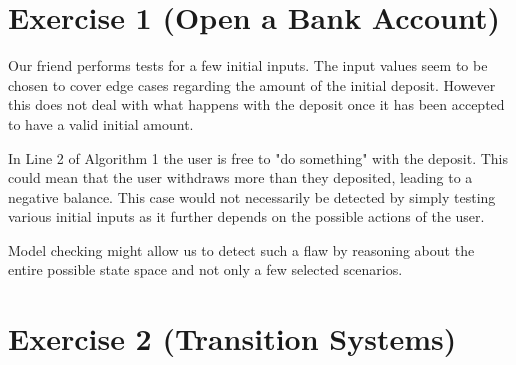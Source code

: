 \documentclass[a4paper,11pt]{scrartcl}
\begin{document}
	
	\section*{Exercise 1 (Open a Bank Account)}
	Our friend performs tests for a few initial inputs. The input values seem to be chosen to cover edge cases regarding the amount of the initial deposit. However this does not deal with what happens with the deposit once it has been accepted to have a valid initial amount.
	
	In Line 2 of Algorithm 1 the user is free to "do something" with the deposit. This could mean that the user withdraws more than they deposited, leading to a negative balance. This case would not necessarily be detected by simply testing various initial inputs as it further depends on the possible actions of the user. 
	
	Model checking might allow us to detect such a flaw by reasoning about the entire possible state space and not only a few selected scenarios.
	
	\section*{Exercise 2 (Transition Systems)}
	
\end{document}
